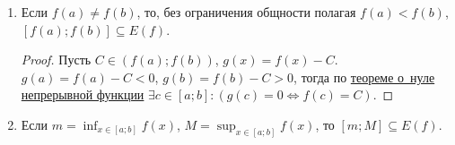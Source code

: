 \begin{enumerate}
	\item \begin{theorem}
	Если $f(a) \neq f(b)$, то, без ограничения общности полагая $f(a) < f(b)$, $[f(a); f(b)] \subseteq E(f)$.
	\end{theorem}
	\begin{proof}
	Пусть $C \in (f(a); f(b))$, $g(x) = f(x) - C$.
	$g(a) = f(a) - C < 0$, $g(b) = f(b) - C > 0$, тогда по \hyperref[th:zero_of_continuous_function]{теореме о~нуле непрерывной функции} $\exists c \in [a; b] \colon (g(c) = 0 \Leftrightarrow f(c) = C)$.
	\end{proof}
	
	\item Если $\displaystyle m = \inf_{x \in [a; b]} f(x)$, $\displaystyle M = \sup_{x \in [a; b]} f(x)$, то $[m; M] \subseteq E(f)$.
\end{enumerate}
